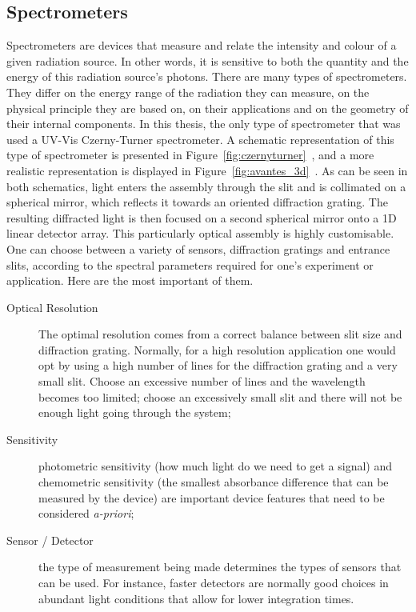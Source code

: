 \subsection{Spectrometers}%
\label{sub:theobg_opticalsystems_spectrometers}

Spectrometers are devices that measure and relate the intensity and
colour of a given radiation source. In other words, it is sensitive to
both the quantity and the energy of this radiation source's photons.
There are many types of spectrometers. They differ on the energy range
of the radiation they can measure, on the physical principle they are
based on, on their applications and on the geometry of their internal
components. In this thesis, the only type of spectrometer that was used
a UV-Vis Czerny-Turner spectrometer. A schematic representation of this
type of spectrometer is presented in
Figure~\ref{fig:czernyturner}~,
and a more realistic representation is displayed in
Figure~\ref{fig:avantes_3d}~\cite{Avantes2022}. As can
be seen in both schematics, light enters the assembly through the slit
and is collimated on a spherical mirror, which reflects it towards an
oriented diffraction grating. The resulting diffracted light is then
focused on a second spherical mirror onto a 1D linear detector array.
This particularly optical assembly is highly customisable. One can
choose between a variety of sensors, diffraction gratings and entrance
slits, according to the spectral parameters required for one's
experiment or application. Here are the most important of them.

\begin{description}
    \item[Optical Resolution] The optimal resolution comes from a
        correct balance between slit size and diffraction grating.
        Normally, for a high resolution application one would opt by
        using a high number of lines for the diffraction grating and a
        very small slit. Choose an excessive number of lines and the
        wavelength becomes too limited; choose an excessively small slit
        and there will not be enough light going through the system;
    \item[Sensitivity] photometric sensitivity (how much light do we
        need to get a signal) and chemometric sensitivity (the smallest
        absorbance difference that can be measured by the device) are
        important device features that need to be considered
        \emph{a-priori};
    \item[Sensor / Detector] the type of measurement being made
        determines the types of sensors that can be used. For instance,
        faster detectors are normally good choices in abundant light
        conditions that allow for lower integration times.
\end{description}

